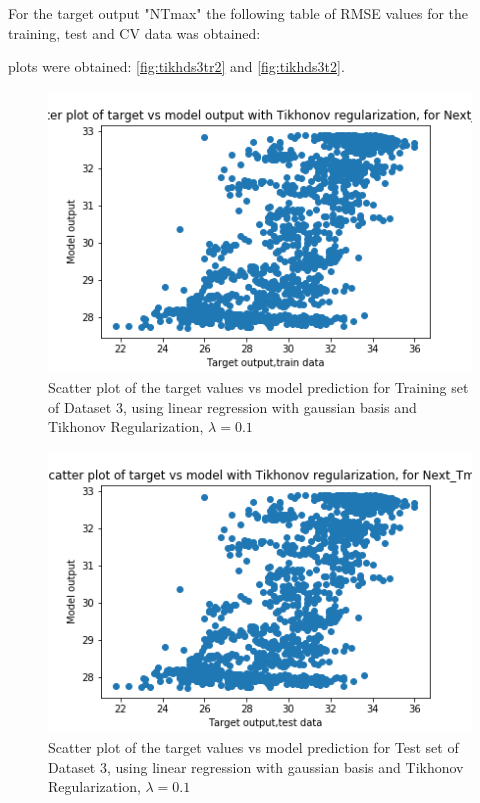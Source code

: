 \documentclass[12pt,a4paper]{article}
\begin{document}
 For the target output "NTmax" the following table of RMSE values for the training, test and CV data was obtained:

 plots were obtained: \autoref{fig:tikhds3tr2} and \autoref{fig:tikhds3t2}.
\begin{figure}[H]
     \centering
     \includegraphics[scale=0.5]{images/scatter_ds3tikhtrainT_max.png}
     \caption{Scatter plot of the target values vs model prediction for Training set of Dataset 3, using linear regression with gaussian basis and Tikhonov Regularization, $\lambda = 0.1 $}
     \label{fig:tikhds3tr2}
\end{figure}
\begin{figure}[H]
     \centering
     \includegraphics[scale=0.5]{images/scatter_ds3tikhtestT_max.png}
     \caption{Scatter plot of the target values vs model prediction for Test set of Dataset 3, using linear regression with gaussian basis and Tikhonov Regularization, $\lambda = 0.1 $}
     \label{fig:tikhds3t2}
\end{figure}
\end{document}
